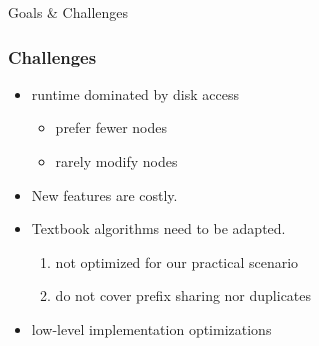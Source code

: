 \documentclass{beamer}
\begin{document}
\begin{section}{Goals \& Challenges}
    \begin{frame}
      \frametitle{Challenges}
        \begin{itemize}
          \item runtime dominated by disk access
          \pause
          \begin{itemize}
            \item prefer fewer nodes
            \pause
            \item rarely modify nodes
          \end{itemize}
          \pause
          \item New features are costly.
          \pause
          \item Textbook algorithms need to be adapted.
          \pause
          \begin{enumerate}
            \item not optimized for our practical scenario
            \pause
            \item do not cover prefix sharing nor duplicates
          \end{enumerate}
          \pause
          \item low-level implementation optimizations
        \end{itemize}
    \end{frame}
  \end{section}
\end{document}
